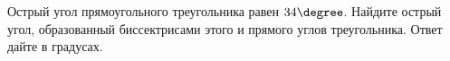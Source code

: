 \begin{ex}
	\begin{condition}
		Острый угол прямоугольного треугольника равен \( 34\degree \). Найдите острый угол, образованный биссектрисами этого и прямого углов треугольника. Ответ дайте в градусах.
	\end{condition}
\end{ex}